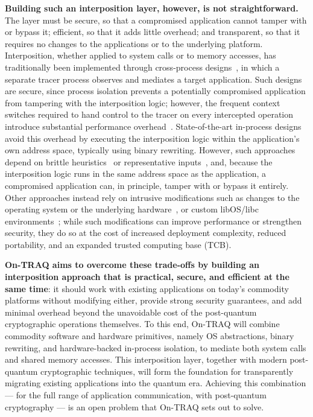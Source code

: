 \documentclass[a4paper,10pt,fleqn]{application}
\begin{document}
\medskip

\textbf{Building such an interposition layer, however, is not straightforward.} The layer must be secure, so that a compromised application cannot tamper with or bypass it; efficient, so that it adds little overhead; and transparent, so that it requires no changes to the applications or to the underlying platform. Interposition, whether applied to system calls or to memory accesses, has traditionally been implemented through cross-process designs~\cite{Volckaert2013GHUMVEE,StraceManual2026,GdbManual2026}, in which a separate tracer process observes and mediates a target application. Such designs are secure, since process isolation prevents a potentially compromised application from tampering with the interposition logic; however, the frequent context switches required to hand control to the tracer on every intercepted operation introduce substantial performance overhead~\cite{Volckaert2016ReMon,Connor2020PKUPitfalls}. State-of-the-art in-process designs avoid this overhead by executing the interposition logic within the application's own address space, typically using binary rewriting. However, such approaches depend on brittle heuristics~\cite{Yasukata2023Zpoline,Jacobs2024LazypolineSyscall} or representative inputs~\cite{Gomez2025ClairObscur}, and, because the interposition logic runs in the same address space as the application, a compromised application can, in principle, tamper with or bypass it entirely. Other approaches instead rely on intrusive modifications such as changes to the operating system or the underlying hardware~\cite{Schrammel2022Jenny,Schrammel2020Donky,Hedayati2019Hodor}, or custom libOS/libc environments~\cite{Yang2024Endokernel}; while such modifications can improve performance or strengthen security, they do so at the cost of increased deployment complexity, reduced portability, and an expanded trusted computing base (TCB).

\medskip

\textbf{On-TRAQ aims to overcome these trade-offs by building an interposition approach that is practical, secure, and efficient at the same time}: it should work with existing applications on today's commodity platforms without modifying either, provide strong security guarantees, and add minimal overhead beyond the unavoidable cost of the post-quantum cryptographic operations themselves. To this end, On-TRAQ will combine commodity software and hardware primitives, namely OS abstractions, binary rewriting, and hardware-backed in-process isolation, to mediate both system calls and shared memory accesses. This interposition layer, together with modern post-quantum cryptographic techniques, will form the foundation for transparently migrating existing applications into the quantum era. Achieving this combination --- for the full range of application communication, with post-quantum cryptography --- is an open problem that On-TRAQ sets out to solve.
\end{document}
